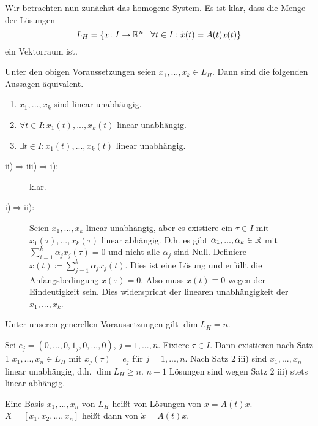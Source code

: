 Wir betrachten nun zun\"achst das homogene System. Es ist klar, dass die Menge der L\"osungen
\[ L_H=\lbrace x\colon I\rightarrow\mathbb{R}^n\mid\forall t\in I:\dot x(t)=A(t)x(t)\rbrace \]
ein Vektorraum ist.
\begin{satz}
	Unter den obigen Voraussetzungen seien $ x_1,...,x_k\in L_H $. Dann sind die folgenden Aussagen \"aquivalent.
	\begin{enumerate}
		\item $ x_1,...,x_k $ sind linear unabh\"angig.
		\item $ \forall t\in I: x_1(t),...,x_k(t) $ linear unabh\"angig.
		\item $ \exists t\in I: x_1(t),...,x_k(t) $ linear unabh\"angig.
	\end{enumerate}
\end{satz}
\begin{beweis}
	\begin{description}
		\item[ii)$ \Rightarrow $iii)$ \Rightarrow $i):] klar.
		\item[i)$ \Rightarrow $ii):] Seien $ x_1,...,x_k $ linear unabh\"angig, aber es existiere ein $ \tau\in I $ mit $ x_1(\tau),...,x_k(\tau) $ linear abh\"angig. D.h. es gibt $ \alpha_1,...,\alpha_k\in\mathbb{R} $ mit $ \sum_{i=1}^{k}\alpha_j x_j(\tau)=0 $ und nicht alle $ \alpha_j $ sind Null.
		Definiere $ x(t)\coloneqq\sum_{j=1}^{k}\alpha_j x_j(t) $. Dies ist eine L\"osung und erf\"ullt die Anfangsbedingung $ x(\tau)=0 $. Also muss $ x(t)\equiv 0 $ wegen der Eindeutigkeit sein. Dies widerspricht der linearen unabh\"angigkeit der $ x_1,...,x_k $.
	\end{description}
\end{beweis}
\begin{satz}
	Unter unseren generellen Voraussetzungen gilt $ \dim L_H=n $.
\end{satz}
\begin{beweis}
	Sei $ e_j=(0,...,0,1_j,0,...,0) $, $ j=1,...,n $. Fixiere $ \tau\in I $. Dann existieren nach Satz 1 $ x_1,...,x_n\in L_H $ mit $ x_j(\tau)=e_j $ f\"ur $ j=1,...,n $. Nach Satz 2 iii) sind $ x_1,...,x_n $ linear unabh\"angig, d.h. $ \dim L_H\geq n $. $ n+1 $ L\"osungen sind wegen Satz 2 iii) stets linear abh\"angig. 
\end{beweis}
\begin{definition}
	Eine Basis $ x_1,...,x_n $ von $ L_H $ hei\ss t  von L\"osungen von $ \dot x=A(t)x $. $ X=[x_1, x_2,..., x_n] $ hei\ss t dann  von $ \dot x= A(t)x $.
\end{definition}
